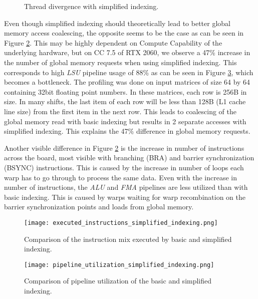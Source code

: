 \begin{figure}[ht]
	\centering
	\def\svgwidth{0.3\textwidth}
	
	\caption{Thread divergence with simplified indexing.}
	\label{fig:warp_per_shift_thread_divergence}
\end{figure}

Even though simplified indexing should theoretically lead to better global memory access coalescing, the opposite seems to be the case as can be seen in Figure \ref{fig:executed_instructions_simplified_indexing}. This may be highly dependent on Compute Capability of the underlying hardware, but on CC 7.5 of RTX 2060, we observe a 47\% increase in the number of global memory requests when using simplified indexing. This corresponds to high \textit{LSU} pipeline usage of 88\% as can be seen in Figure \ref{fig:pipeline_utilization_simplified_indexing}, which becomes a bottleneck. The profiling was done on input matrices of size 64 by 64 containing 32bit floating point numbers. In these matrices, each row is 256B in size. In many shifts, the last item of each row will be less than 128B (L1 cache line size) from the first item in the next row. This leads to coalescing of the global memory read with basic indexing but results in 2 separate accesses with simplified indexing. This explains the 47\% difference in global memory requests.

Another visible difference in Figure \ref{fig:executed_instructions_simplified_indexing} is the increase in number of instructions across the board, most visible with branching (BRA) and barrier synchronization (BSYNC) instructions. This is caused by the increase in number of loops each warp has to go through to process the same data. Even with the increase in number of instructions, the \textit{ALU} and \textit{FMA} pipelines are less utilized than with basic indexing. This is caused by warps waiting for warp recombination on the barrier synchronization points and loads from global memory.

\begin{figure}[ht]
	\centering
	\texttt{[image: executed\_instructions\_simplified\_indexing.png]}
	\caption{Comparison of the instruction mix executed by basic and simplified indexing.}
	\label{fig:executed_instructions_simplified_indexing}
\end{figure}

\begin{figure}[ht]
	\centering
	\texttt{[image: pipeline\_utilization\_simplified\_indexing.png]}
	\caption{Comparison of pipeline utilization of the basic and simplified indexing.}
	\label{fig:pipeline_utilization_simplified_indexing}
\end{figure}

